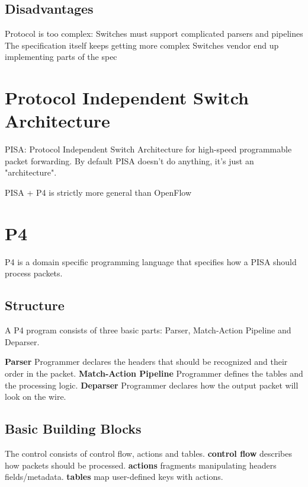 \documentclass[a4paper, fontsize=8pt, landscape, DIV=1]{scrartcl}
\begin{document}
\begin{multicols*}{4}
  \subsection{Disadvantages}
  \begin{outline}
    \1 Protocol is too complex:
    Switches must support complicated parsers and pipelines
    \1 The specification itself keeps getting more complex
    \1 Switches vendor end up implementing parts of the spec
  \end{outline}

  \section{Protocol Independent Switch Architecture}
  PISA: Protocol Independent Switch Architecture for high-speed programmable
  packet forwarding. By default PISA doesn't do anything, it's just an "architecture".

  PISA + P4 is strictly more general than OpenFlow

  \section{P4}
  P4 is a domain specific programming language that specifies how a PISA should
  process packets.
  \subsection{Structure}
  A P4 program consists of three basic parts: Parser, Match-Action Pipeline and
  Deparser. 

  \textbf{Parser} Programmer declares the headers that should be recognized and
  their order in the packet. 
  \textbf{Match-Action Pipeline} Programmer defines the tables and the processing
  logic.
  \textbf{Deparser} Programmer declares how the output packet will look on the wire.

  \subsection{Basic Building Blocks}
  The control consists of control flow, actions and tables.
  \textbf{control flow} describes how packets should be processed.
  \textbf{actions} fragments manipulating headers fields/metadata.
  \textbf{tables} map user-defined keys with actions.


\end{multicols*}
\end{document}
